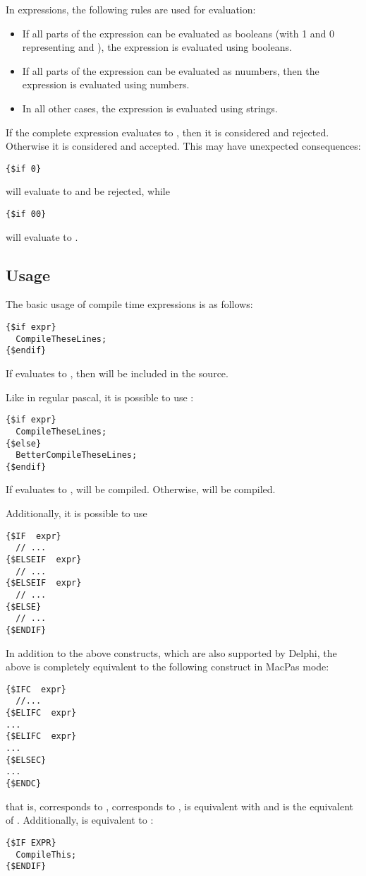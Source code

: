 In expressions, the following rules are used for evaluation:
\begin{itemize}
\item If all parts of the expression can be evaluated as booleans (with 1
and 0 representing  and ), the expression is evaluated
using booleans. 
\item If all parts of the expression can be evaluated as nuumbers, then the
expression is evaluated using numbers.
\item In all other cases, the expression is evaluated using strings.
\end{itemize}
If the complete expression evaluates to , then it is considered
 and rejected. Otherwise it is considered  and accepted. 
This may have unexpected consequences:
\begin{verbatim}
{$if 0}
\end{verbatim}
will evaluate to  and be rejected, while
\begin{verbatim}
{$if 00}
\end{verbatim}
will evaluate to .

\subsection{Usage}
The basic usage of compile time expressions is as follows:
\begin{verbatim}
{$if expr}
  CompileTheseLines;
{$endif}
\end{verbatim}
If  evaluates to , then  will be
included in the source.

Like in regular pascal, it is possible to use :
\begin{verbatim}
{$if expr}
  CompileTheseLines;
{$else}
  BetterCompileTheseLines;
{$endif}
\end{verbatim}
If  evaluates to ,   will be
compiled. Otherwise,  will be compiled.

Additionally, it is possible to use 
\begin{verbatim}
{$IF  expr}
  // ...
{$ELSEIF  expr}
  // ...
{$ELSEIF  expr}
  // ...
{$ELSE}
  // ...
{$ENDIF}
\end{verbatim}

In addition to the above constructs, which are also supported by Delphi,
the above is completely equivalent to the following construct in MacPas mode:
\begin{verbatim}
{$IFC  expr}
  //...
{$ELIFC  expr}
...
{$ELIFC  expr}
...
{$ELSEC}
...
{$ENDC}
\end{verbatim}
that is,  corresponds to ,  corresponds to
,  is equivalent with  and  is
the equivalent of . Additionally,  is equivalent to
:
\begin{verbatim}
{$IF EXPR}
  CompileThis;
{$ENDIF}
\end{verbatim}

